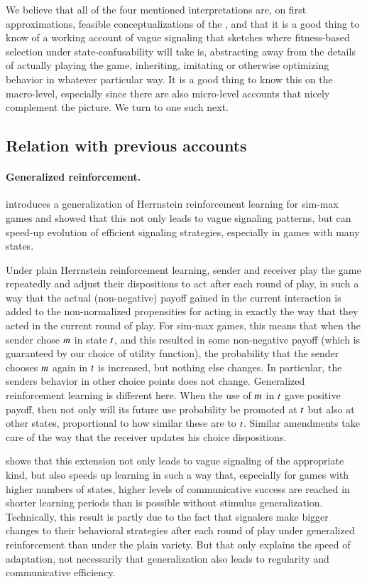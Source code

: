 We believe that all of the four mentioned interpretations are, on
first approximations, feasible conceptualizations of the \rdd, and
that it is a good thing to know of a working account of vague
signaling that sketches where fitness-based selection under
state-confusability will take is, abstracting away from the details of
actually playing the game, inheriting, imitating or otherwise
optimizing behavior in whatever particular way. It is a good thing to
know this on the macro-level, especially since there are also
micro-level accounts that nicely complement the picture. We turn to
one such next.


\subsection{Relation with previous accounts}
\label{sec:relat-with-prev}

\paragraph{Generalized reinforcement.}
\citet{OConnor2013:The-Evolution-o} introduces a generalization of
Herrnstein reinforcement learning for sim-max games and showed that
this not only leads to vague signaling patterns, but can speed-up
evolution of efficient signaling strategies, especially in games with
many states. 

Under plain Herrnstein reinforcement learning, sender and receiver
play the game repeatedly and adjust their dispositions to act after
each round of play, in such a way that the actual (non-negative)
payoff gained in the current interaction is added to the
non-normalized propensities for acting in exactly the way that they
acted in the current round of play. For sim-max games, this means that
when the sender chose $m$ in state $t$, and this resulted in
some non-negative payoff (which is guaranteed by our choice of utility
function), the probability that the sender chooses $m$ again in
$t$ is increased, but nothing else changes. In particular, the
senders behavior in other choice points does not change. Generalized
reinforcement learning is different here. When the use of $m$ in
$t$ gave positive payoff, then not only will its future use
probability be promoted at $t$ but also at other states,
proportional to how similar these are to $t$. Similar amendments
take care of the way that the receiver updates his choice
dispositions.

\citet{OConnor2013:The-Evolution-o} shows that this extension not only
leads to vague signaling of the appropriate kind, but also speeds up
learning in such a way that, especially for games with higher numbers
of states, higher levels of communicative success are reached in
shorter learning periods than is possible without stimulus
generalization. Technically, this result is partly due to the fact
that signalers make bigger changes to their behavioral strategies
after each round of play under generalized reinforcement than under
the plain variety. But that only explains the speed of adaptation, not
necessarily that generalization also leads to regularity and
communicative efficiency. 


